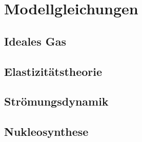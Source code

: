 %
%
%
\chapter{Modellgleichungen%
\label{skript:chapter:modellgleichungen}}
\rhead{}
\section{Ideales Gas}

\section{Elastizitätstheorie}

\section{Strömungsdynamik}

\section{Nukleosynthese}
